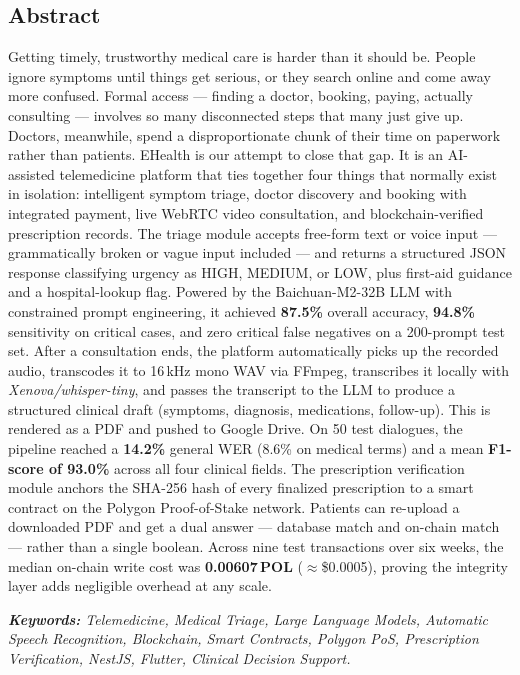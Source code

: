 \begin{center}
    \section*{Abstract}
\end{center}

\begin{onehalfspace}
\setlength{\parindent}{0pt}
\setlength{\parskip}{4pt}

\large
Getting timely, trustworthy medical care is harder than it should be. People ignore symptoms until things get serious, or they search online and come away more confused. Formal access --- finding a doctor, booking, paying, actually consulting --- involves so many disconnected steps that many just give up. Doctors, meanwhile, spend a disproportionate chunk of their time on paperwork rather than patients. EHealth is our attempt to close that gap. It is an AI-assisted telemedicine platform that ties together four things that normally exist in isolation: intelligent symptom triage, doctor discovery and booking with integrated payment, live WebRTC video consultation, and blockchain-verified prescription records.  The triage module accepts free-form text or voice input --- grammatically broken or vague input included --- and returns a structured JSON response classifying urgency as HIGH, MEDIUM, or LOW, plus first-aid guidance and a hospital-lookup flag. Powered by the Baichuan-M2-32B LLM with constrained prompt engineering, it achieved \textbf{87.5\%} overall accuracy, \textbf{94.8\%} sensitivity on critical cases, and zero critical false negatives on a 200-prompt test set. After a consultation ends, the platform automatically picks up the recorded audio, transcodes it to 16\,kHz mono WAV via FFmpeg, transcribes it locally with \textit{Xenova/whisper-tiny}, and passes the transcript to the LLM to produce a structured clinical draft (symptoms, diagnosis, medications, follow-up). This is rendered as a PDF and pushed to Google Drive. On 50 test dialogues, the pipeline reached a \textbf{14.2\%} general WER (8.6\% on medical terms) and a mean \textbf{F1-score of 93.0\%} across all four clinical fields. The prescription verification module anchors the SHA-256 hash of every finalized prescription to a smart contract on the Polygon Proof-of-Stake network. Patients can re-upload a downloaded PDF and get a dual answer --- database match and on-chain match --- rather than a single boolean. Across nine test transactions over six weeks, the median on-chain write cost was \textbf{0.00607\,POL} (${\approx}$\$0.0005), proving the integrity layer adds negligible overhead at any scale.

\vspace{3mm}
\textit{\textbf{Keywords:} Telemedicine, Medical Triage, Large Language Models, Automatic Speech Recognition, Blockchain, Smart Contracts, Polygon PoS, Prescription Verification, NestJS, Flutter, Clinical Decision Support.}

\end{onehalfspace}